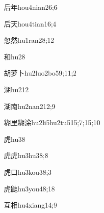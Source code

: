 \begin{verbete}{后年}{hou4nian2}{6;6}
\end{verbete}

\begin{verbete}{后天}{hou4tian1}{6;4}
\end{verbete}

\begin{verbete}{忽然}{hu1ran2}{8;12}
\end{verbete}

\begin{verbete}{和}{hu2}{8}
\end{verbete}

\begin{verbete}{胡萝卜}{hu2luo2bo5}{9;11;2}
\end{verbete}

\begin{verbete}{湖}{hu2}{12}
\end{verbete}

\begin{verbete}{湖南}{hu2nan2}{12;9}
\end{verbete}

\begin{verbete}{糊里糊涂}{hu2li5hu2tu5}{15;7;15;10}
\end{verbete}

\begin{verbete}{虎}{hu3}{8}
\end{verbete}

\begin{verbete}{虎虎}{hu3hu3}{8;8}
\end{verbete}

\begin{verbete}{虎口}{hu3kou3}{8;3}
\end{verbete}

\begin{verbete}{虎鼬}{hu3you4}{8;18}
\end{verbete}

\begin{verbete}{互相}{hu4xiang1}{4;9}
\end{verbete}

